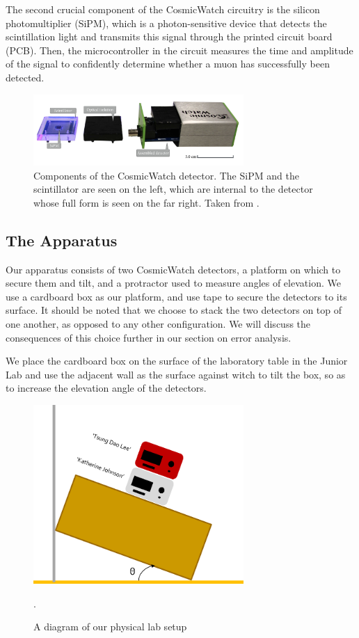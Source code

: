 \documentclass[aps,twocolumn,secnumarabic,balancelastpage,amsmath,amssymb,nofootinbib, floatfix]{revtex4-2}
\begin{document}
	The second crucial component of the CosmicWatch circuitry is the silicon photomultiplier (SiPM), which is a photon-sensitive device that detects the scintillation light and transmits this signal through the printed circuit board (PCB). Then, the microcontroller in the circuit measures the time and amplitude of the signal to confidently determine whether a muon has successfully been detected. 
	
	\begin{figure}[H]
		\includegraphics[width=8cm]{cosmicwatch_comps.png}
		\caption{Components of the CosmicWatch detector. The SiPM and the scintillator are seen on the left, which are internal to the detector whose full form is seen on the far right. Taken from \cite{labmanual}.}
		\label{fig:components}
	\end{figure}
	
	
	\subsection{The Apparatus}
	Our apparatus consists of two CosmicWatch detectors, a platform on which to secure them and tilt, and a protractor used to measure angles of elevation. We use a cardboard box as our platform, and use tape to secure the detectors to its surface. It should be noted that we choose to stack the two detectors on top of one another, as opposed to any other configuration. We will discuss the consequences of this choice further in our section on error analysis.
	
	We place the cardboard box on the surface of the laboratory table in the Junior Lab and use the adjacent wall as the surface against witch to tilt the box, so as to increase the elevation angle of the detectors. 
	
	\begin{figure}[H]
		\includegraphics[width=8cm]{setup_diagram.png}
		\caption{A diagram of our physical lab setup}.
		\label{fig:setup}
	\end{figure}
	
\end{document}
